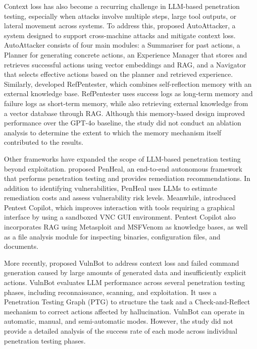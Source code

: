 \documentclass[acmtog]{acmart}
\begin{document}
Context loss has also become a recurring challenge in LLM-based penetration testing, especially when attacks involve multiple steps, large tool outputs, or lateral movement across systems. To address this, \citet{xu_autoattacker_2024} proposed AutoAttacker, a system designed to support cross-machine attacks and mitigate context loss. AutoAttacker consists of four main modules: a Summariser for past actions, a Planner for generating concrete actions, an Experience Manager that stores and retrieves successful actions using vector embeddings and RAG, and a Navigator that selects effective actions based on the planner and retrieved experience. Similarly, \citet{dai_refpentester_2025} developed RefPentester, which combines self-reflection memory with an external knowledge base. RefPentester uses success logs as long-term memory and failure logs as short-term memory, while also retrieving external knowledge from a vector database through RAG. Although this memory-based design improved performance over the GPT-4o baseline, the study did not conduct an ablation analysis to determine the extent to which the memory mechanism itself contributed to the results.

Other frameworks have expanded the scope of LLM-based penetration testing beyond exploitation. \citet{huang_penheal_2023} proposed PenHeal, an end-to-end autonomous framework that performs penetration testing and provides remediation recommendations. In addition to identifying vulnerabilities, PenHeal uses LLMs to estimate remediation costs and assess vulnerability risk levels. Meanwhile, \citet{goyal_hacking_2025} introduced Pentest Copilot, which improves interaction with tools requiring a graphical interface by using a sandboxed VNC GUI environment. Pentest Copilot also incorporates RAG using Metasploit and MSFVenom as knowledge bases, as well as a file analysis module for inspecting binaries, configuration files, and documents.

More recently, \citet{kong_vulnbot_2025} proposed VulnBot to address context loss and failed command generation caused by large amounts of generated data and insufficiently explicit actions. VulnBot evaluates LLM performance across several penetration testing phases, including reconnaissance, scanning, and exploitation. It uses a Penetration Testing Graph (PTG) to structure the task and a Check-and-Reflect mechanism to correct actions affected by hallucination. VulnBot can operate in automatic, manual, and semi-automatic modes. However, the study did not provide a detailed analysis of the success rate of each mode across individual penetration testing phases.
\end{document}
